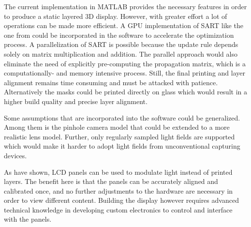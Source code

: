 The current implementation in MATLAB provides the necessary features in order to produce a static layered 3D display.
However, with greater effort a lot of operations can be made more efficient.
A GPU implementation of SART like the one from \cite{SARTGPU} could be incorporated in the software to accelerate the optimization process.
A parallelization of SART is possible because the update rule depends solely on matrix multiplication and addition.
The parallel approach would also eliminate the need of explicitly pre-computing the propagation matrix, which is a computationally- and memory intensive process.
Still, the final printing and layer alignment remains time consuming and must be attacked with patience.
Alternatively the masks could be printed directly on glass which would result in a higher build quality and precise layer alignment.

Some assumptions that are incorporated into the software could be generalized.
Among them is the pinhole camera model that could be extended to a more realistic lens model.
Further, only regularly sampled light fields are supported which would make it harder to adopt light fields from unconventional capturing devices.

As \cite{WetzsteinTensor} have shown, LCD panels can be used to modulate light instead of printed layers.
The benefit here is that the panels can be accurately aligned and calibrated once, and no further adjustments to the hardware are necessary in order to view different content.
Building the display however requires advanced technical knowledge in developing custom electronics to control and interface with the panels.